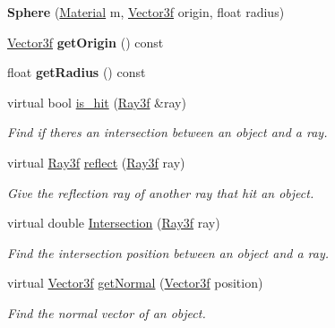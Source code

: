 \begin{DoxyCompactItemize}
\item 
\mbox{\label{class_sphere_a9c65eef465ec94ededb06398a8be246c}} 
{\bfseries Sphere} (\mbox{\hyperlink{class_material}{Material}} m, \mbox{\hyperlink{class_vector3f}{Vector3f}} origin, float radius)
\item 
\mbox{\label{class_sphere_abe994d42b65ae2f23efed35b994e3434}} 
\mbox{\hyperlink{class_vector3f}{Vector3f}} {\bfseries get\+Origin} () const
\item 
\mbox{\label{class_sphere_a925a4eccca10735eb3f9ec03ad87abf1}} 
float {\bfseries get\+Radius} () const
\item 
virtual bool \mbox{\hyperlink{class_sphere_a29e5c6f306c166c59b5d462205177f27}{is\+\_\+hit}} (\mbox{\hyperlink{class_ray3f}{Ray3f}} \&ray)
\begin{DoxyCompactList}\small\item\em Find if there\textquotesingle{}s an intersection between an object and a ray. \end{DoxyCompactList}\item 
virtual \mbox{\hyperlink{class_ray3f}{Ray3f}} \mbox{\hyperlink{class_sphere_a4ba50719ce557c0ff9a85333d0524bad}{reflect}} (\mbox{\hyperlink{class_ray3f}{Ray3f}} ray)
\begin{DoxyCompactList}\small\item\em Give the reflection ray of another ray that hit an object. \end{DoxyCompactList}\item 
virtual double \mbox{\hyperlink{class_sphere_af9c784cb35851974251e1585e3717dd9}{Intersection}} (\mbox{\hyperlink{class_ray3f}{Ray3f}} ray)
\begin{DoxyCompactList}\small\item\em Find the intersection position between an object and a ray. \end{DoxyCompactList}\item 
virtual \mbox{\hyperlink{class_vector3f}{Vector3f}} \mbox{\hyperlink{class_sphere_a46b57f659960b0862efcb6a7be9f1846}{get\+Normal}} (\mbox{\hyperlink{class_vector3f}{Vector3f}} position)
\begin{DoxyCompactList}\small\item\em Find the normal vector of an object. \end{DoxyCompactList}\end{DoxyCompactItemize}
